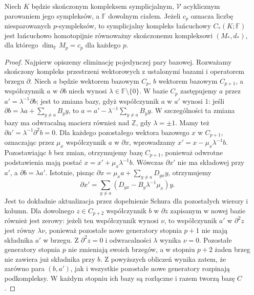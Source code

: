 \begin{stwierdzenie}
\label{thm:tg-forman-algebraic-cancellation}
Niech $K$ będzie skończonym kompleksem symplicjalnym,
$\mathcal V$ acyklicznym parowaniem jego sympleksów,
a $\mathbb F$ dowolnym ciałem. Jeżeli $c_p$ oznacza
liczbę niesparowanych $p$-sympleksów, to symplicjalny
kompleks łańcuchowy $C_*(K;\mathbb F)$ jest
łańcuchowo homotopijnie równoważny skończonemu
kompleksowi $(M_*,d_*)$, dla którego
$\dim_{\mathbb F}M_p=c_p$ dla każdego $p$.
\end{stwierdzenie}

\begin{proof}
Najpierw opiszemy eliminację pojedynczej pary bazowej.
Rozważamy skończony kompleks przestrzeni wektorowych
z ustalonymi bazami i operatorem brzegu $\partial$.
Niech $a$ będzie wektorem bazowym $C_p$,
$b$ wektorem bazowym $C_{p+1}$, a współczynnik
$a$ w $\partial b$ niech wynosi
$\lambda\in\mathbb F\setminus\{0\}$.
W bazie $C_p$ zastępujemy $a$ przez
$a'=\lambda^{-1}\partial b$; jest to zmiana bazy,
gdyż współczynnik $a$ w $a'$ wynosi $1$:
jeśli $\partial b=\lambda a+\sum_{y\ne a}B_y y$,
to $a=a'-\lambda^{-1}\sum_{y\ne a}B_y y$.
W szczególności ta zmiana bazy ma odwracalną
macierz również nad $\mathbb Z$, gdy $\lambda=\pm1$.
Mamy też $\partial a'=\lambda^{-1}\partial^2b=0$.
Dla każdego pozostałego wektora bazowego $x$
w $C_{p+1}$, oznaczając przez $\mu_x$
współczynnik $a$ w $\partial x$, wprowadzamy
$x'=x-\mu_x\lambda^{-1}b$.
Pozostawiając $b$ bez zmian, otrzymujemy bazę
$C_{p+1}$, ponieważ odwrotne podstawienia mają
postać $x=x'+\mu_x\lambda^{-1}b$. Wówczas $\partial x'$ nie ma składowej przy $a'$,
a $\partial b=\lambda a'$. Istotnie, pisząc
$\partial x=\mu_x a+\sum_{y\ne a}D_{yx}y$,
otrzymujemy
\[
 \partial x'=\sum_{y\ne a}
 (D_{yx}-B_y\lambda^{-1}\mu_x)y.
\]
Jest to dokładnie aktualizacja przez dopełnienie
Schura dla pozostałych wierszy i kolumn.
Dla dowolnego $z\in C_{p+2}$ współczynnik
$b$ w $\partial z$ zapisanym w nowej bazie również
jest zerowy: jeżeli ten współczynnik wynosi $\nu$, to
współczynnik $a'$ w $\partial^2 z$ jest równy
$\lambda\nu$, ponieważ pozostałe nowe generatory
stopnia $p+1$ nie mają składnika $a'$ w brzegu.
Z $\partial^2z=0$ i odwracalności $\lambda$ wynika
$\nu=0$.
Pozostałe generatory stopnia $p$ nie zmieniają
swoich brzegów, a w stopniu $p+2$ żaden brzeg
nie zawiera już składnika przy $b$. Z powyższych
obliczeń wynika zatem, że zarówno para $(b,a')$,
jak i wszystkie pozostałe nowe generatory
rozpinają podkompleksy. W każdym stopniu ich
bazy są rozłączne i razem tworzą bazę $C$.

\end{proof}
